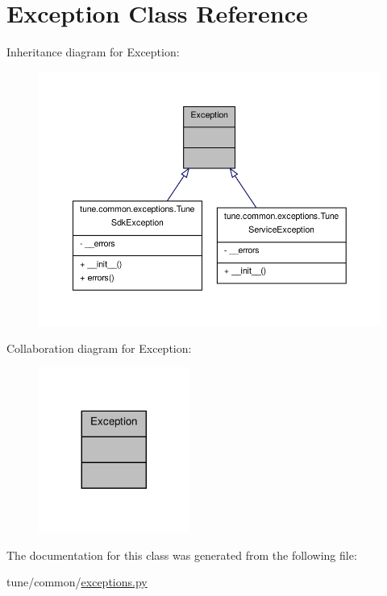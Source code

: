\hypertarget{classException}{\section{Exception Class Reference}
\label{classException}
}


Inheritance diagram for Exception\-:
\nopagebreak
\begin{figure}[H]
\begin{center}
\leavevmode
\includegraphics[width=350pt]{classException__inherit__graph}
\end{center}
\end{figure}


Collaboration diagram for Exception\-:
\nopagebreak
\begin{figure}[H]
\begin{center}
\leavevmode
\includegraphics[width=140pt]{classException__coll__graph}
\end{center}
\end{figure}


The documentation for this class was generated from the following file\-:\begin{DoxyCompactItemize}
\item 
tune/common/\hyperlink{exceptions_8py}{exceptions.\-py}\end{DoxyCompactItemize}
